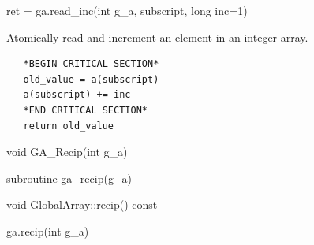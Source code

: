 \documentclass[12pt]{article}
\begin{document}
\begin{pyapi}
\begin{pycode}
ret = ga.read_inc(int g_a, subscript, long inc=1)
\end{pycode}
\begin{funcargs}
\end{funcargs}
\end{pyapi}

\ncoll

\begin{desc}

Atomically read and increment an element in an integer array.

\begin{verbatim}
   *BEGIN CRITICAL SECTION*
   old_value = a(subscript)
   a(subscript) += inc
   *END CRITICAL SECTION*
   return old_value
\end{verbatim}

\end{desc}


\begin{capi}
\begin{ccode}
void GA_Recip(int g_a)
\end{ccode}
\begin{funcargs}
\end{funcargs}
\end{capi}

\begin{fapi}
\begin{fcode}
subroutine ga_recip(g_a)
\end{fcode}
\begin{funcargs}
\end{funcargs}
\end{fapi}

\begin{cxxapi}
\begin{cxxcode}
void GlobalArray::recip() const
\end{cxxcode}
\end{cxxapi}

\begin{pyapi}
\begin{pycode}
ga.recip(int g_a)
\end{pycode}
\begin{funcargs}
\end{funcargs}
\end{pyapi}
\end{document}
